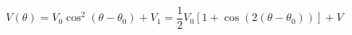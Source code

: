 \begin{equation}
\label{eq:Photodiode_Voltage}
V(\theta) = V_{0} \cos^2(\theta - {\theta}_0)+ V_{1} = \frac{1}{2}V_0\left[1 + \cos(2 (\theta - \theta_0))\right]+ V
\end{equation}